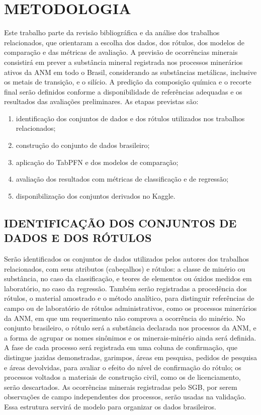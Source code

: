 \chapter{METODOLOGIA}
\label{chap:metodologia}

Este trabalho parte da revisão bibliográfica e da análise dos trabalhos relacionados, que orientaram a escolha dos dados, dos rótulos, dos modelos de comparação e das métricas de avaliação. A previsão de ocorrências minerais consistirá em prever a substância mineral registrada nos processos minerários ativos da ANM em todo o Brasil, considerando as substâncias metálicas, inclusive os metais de transição, e o silício. A predição da composição química e o recorte final serão definidos conforme a disponibilidade de referências adequadas e os resultados das avaliações preliminares. As etapas previstas são:

\begin{enumerate}
    \renewcommand{\labelenumi}{\alph{enumi})}
    \item identificação dos conjuntos de dados e dos rótulos utilizados nos trabalhos relacionados;
    \item construção do conjunto de dados brasileiro;
    \item aplicação do TabPFN e dos modelos de comparação;
    \item avaliação dos resultados com métricas de classificação e de regressão;
    \item disponibilização dos conjuntos derivados no Kaggle.
\end{enumerate}

\section{IDENTIFICAÇÃO DOS CONJUNTOS DE DADOS E DOS RÓTULOS}

Serão identificados os conjuntos de dados utilizados pelos autores dos trabalhos relacionados, com seus atributos (cabeçalhos) e rótulos: a classe de minério ou substância, no caso da classificação, e teores de elementos ou óxidos medidos em laboratório, no caso da regressão. Também serão registradas a procedência dos rótulos, o material amostrado e o método analítico, para distinguir referências de campo ou de laboratório de rótulos administrativos, como os processos minerários da ANM, em que um requerimento não comprova a ocorrência do minério. No conjunto brasileiro, o rótulo será a substância declarada nos processos da ANM, e a forma de agrupar os nomes sinônimos e os minerais-minério ainda será definida. A fase de cada processo será registrada em uma coluna de confirmação, que distingue jazidas demonstradas, garimpos, áreas em pesquisa, pedidos de pesquisa e áreas devolvidas, para avaliar o efeito do nível de confirmação do rótulo; os processos voltados a materiais de construção civil, como os de licenciamento, serão descartados. As ocorrências minerais registradas pelo SGB, por serem observações de campo independentes dos processos, serão usadas na validação. Essa estrutura servirá de modelo para organizar os dados brasileiros.

